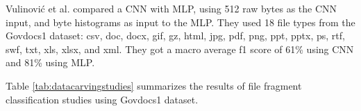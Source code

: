 Vulinović et al. \cite{vulinovic_neural_2019}
compared a CNN with MLP, using 512 raw bytes as the CNN input, and byte histograms as input to the MLP.
They used 18 file types from the Govdocs1 dataset: csv, doc, docx, gif, gz, html, jpg, pdf, png, ppt, pptx, ps, rtf, swf, txt, xls, xlsx, and xml.
They got a macro average f1 score of 61\% using CNN and 81\% using MLP.

Table \ref{tab:datacarvingstudies} summarizes 
the results of file fragment classification studies using Govdocs1 dataset.

\begin{table*}[!ht]
\caption{\label{tab:datacarvingstudies}File fragment classification studies using Govdocs1 dataset}
\end{table*}
